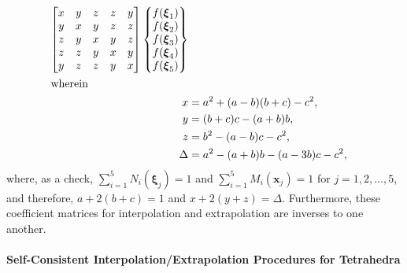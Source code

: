 \begin{subequations}
\begin{align}
\begin{bmatrix}
        x & y & z & z & y \\
        y & x & y & z & z \\
        z & y & x & y & z \\
        z & z & y & x & y \\
        y & z & z & y & x
        \end{bmatrix} \left\{ \begin{matrix}
        f ( \boldsymbol{\xi}_1 ) \\ 
        f ( \boldsymbol{\xi}_2 ) \\ 
        f ( \boldsymbol{\xi}_3 ) \\ 
        f ( \boldsymbol{\xi}_4 ) \\ 
        f ( \boldsymbol{\xi}_5 )
        \end{matrix} \right\}  \\
        \intertext{wherein}
        x & = a^2 + (a-b)(b+c) - c^2, \\
        y & = (b+c)c - (a+b)b, \\
        z & = b^2 - (a-b)c - c^2, \\
        \Delta & = a^2 - (a+b)b - (a-3b)c - c^2,
        \end{align}
    \end{subequations}
    where, as a check, $\sum_{i=1}^5 N_i (\boldsymbol{\xi}_j) = 1$ and $\sum_{i=1}^5 M_i (\boldsymbol{x}_j) = 1$ for $j=1,2,\ldots,5$, and therefore, $a + 2(b + c) = 1$ and $x + 2(y + z) = \Delta$.  Furthermore, these coefficient matrices for interpolation and extrapolation are inverses to one another.  
    
\paragraph {Self-Consistent Interpolation\slash Extrapolation Procedures for Tetrahedra}
    
